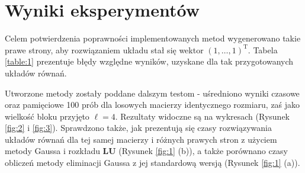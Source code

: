 \documentclass{classrep}
\newcommand{\mL}{\bm{L}}
\newcommand{\mU}{\bm{U}}
\begin{document}
\section{Wyniki eksperymentów}	
	Celem potwierdzenia poprawności implementowanych metod wygenerowano takie prawe strony, aby rozwiązaniem układu stał się wektor $(1,\ldots,1)^\mathrm T$. Tabela \ref{table:1} prezentuje błędy względne wyników, uzyskane dla tak przygotowanych układów równań.


	Utworzone metody zostały poddane dalszym testom - uśredniono wyniki czasowe oraz pamięciowe 100 prób dla losowych macierzy identycznego rozmiaru, zaś jako wielkość bloku przyjęto $\ell=4$. Rezultaty widoczne są na wykresach (Rysunek \ref{fig:2} i \ref{fig:3}). Sprawdzono także, jak prezentują się czasy rozwiązywania układów równań dla tej samej macierzy i różnych prawych stron z użyciem metody Gaussa i rozkładu $\mL\mU$ (Rysunek \ref{fig:1} (b)), a także porównano czasy obliczeń metody eliminacji Gaussa z jej standardową wersją (Rysunek \ref{fig:1} (a)).	
	
\end{document}
